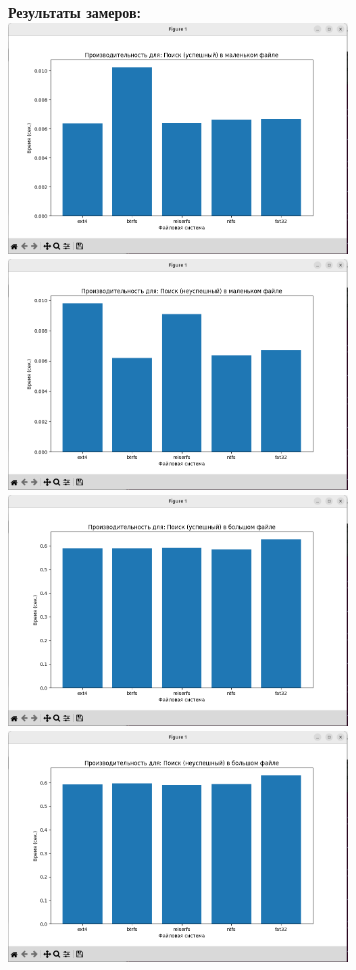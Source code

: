 \documentclass[a4paper,14pt]{extarticle}
\begin{document}
\textbf{Результаты замеров:}\\
\includegraphics[width=90mm]{task2_a.png}
\includegraphics[width=90mm]{task2_b.png}\\
\includegraphics[width=90mm]{task2_c.png}
\includegraphics[width=90mm]{task2_d.png}\\
\end{document}
